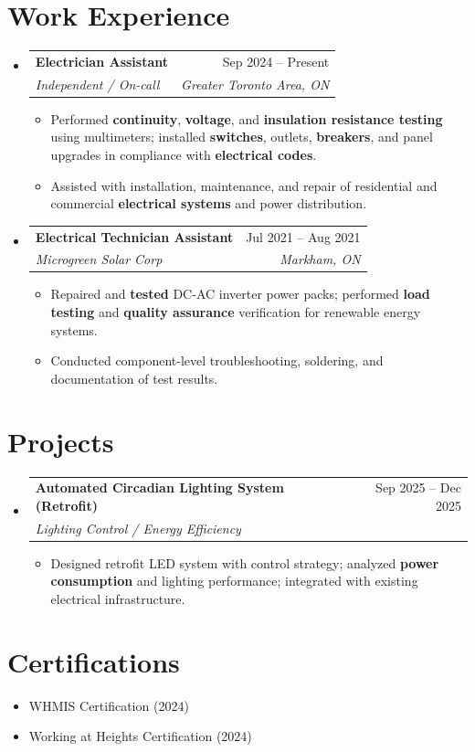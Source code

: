 \documentclass[letterpaper,11pt]{article}
\makeatletter
\newcommand{\resumeItem}[1]{\item\small{{#1 \vspace{-2pt}}}}
\newcommand{\resumeSubheading}[4]{
  \vspace{-2pt}\item
    \begin{tabular*}{0.97\textwidth}[t]{l@{\extracolsep{\fill}}r}
      \textbf{#1} & #2 \\
      \textit{\small #3} & \textit{\small #4} \\
    \end{tabular*}\vspace{-7pt}
}
\newcommand{\resumeSubHeadingListStart}{\begin{itemize}[leftmargin=0.15in, label={}]}
\newcommand{\resumeSubHeadingListEnd}{\end{itemize}}
\newcommand{\resumeItemListStart}{\begin{itemize}}
\newcommand{\resumeItemListEnd}{\end{itemize}\vspace{-5pt}}
\makeatother
\begin{document}
\section{Work Experience}
\resumeSubHeadingListStart

\resumeSubheading
  {Electrician Assistant}{Sep 2024 -- Present}
  {Independent / On-call}{Greater Toronto Area, ON}
\resumeItemListStart
  \resumeItem{Performed \textbf{continuity}, \textbf{voltage}, and \textbf{insulation resistance testing} using multimeters; installed \textbf{switches}, outlets, \textbf{breakers}, and panel upgrades in compliance with \textbf{electrical codes}.}
  \resumeItem{Assisted with installation, maintenance, and repair of residential and commercial \textbf{electrical systems} and power distribution.}
\resumeItemListEnd

\resumeSubheading
  {Electrical Technician Assistant}{Jul 2021 -- Aug 2021}
  {Microgreen Solar Corp}{Markham, ON}
\resumeItemListStart
  \resumeItem{Repaired and \textbf{tested} DC-AC inverter power packs; performed \textbf{load testing} and \textbf{quality assurance} verification for renewable energy systems.}
  \resumeItem{Conducted component-level troubleshooting, soldering, and documentation of test results.}
\resumeItemListEnd

\resumeSubHeadingListEnd

\section{Projects}
\resumeSubHeadingListStart
\resumeSubheading
  {Automated Circadian Lighting System (Retrofit)}{Sep 2025 -- Dec 2025}
  {Lighting Control / Energy Efficiency}{ }
\resumeItemListStart
  \resumeItem{Designed retrofit LED system with control strategy; analyzed \textbf{power consumption} and lighting performance; integrated with existing electrical infrastructure.}
\resumeItemListEnd

\resumeSubHeadingListEnd

\section{Certifications}
\begin{itemize}[leftmargin=0.15in]
  \item WHMIS Certification (2024)
  \item Working at Heights Certification (2024)
\end{itemize}
\end{document}
